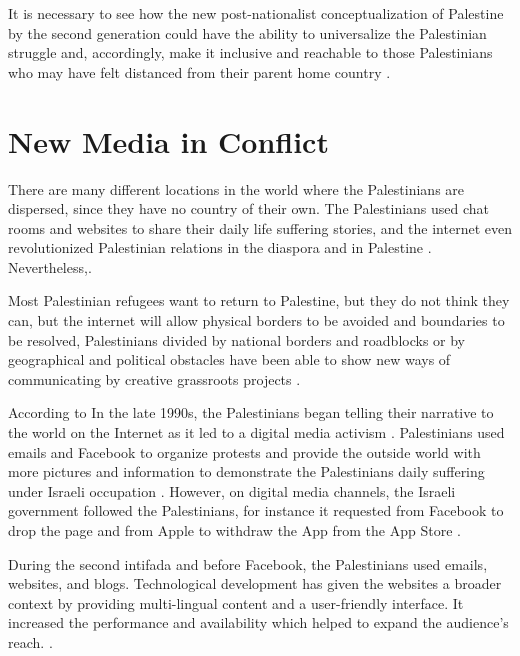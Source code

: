 It is necessary to see how the new post-nationalist conceptualization of Palestine by the second generation could have the ability to universalize the Palestinian struggle and, accordingly, make it inclusive and reachable to those Palestinians who may have felt distanced from their parent home country \citep{Blachnicka-Ciacek2018}. 

\section{New Media in Conflict}
There are many different locations in the world where the Palestinians are dispersed, since they have no country of their own. The Palestinians used chat rooms and websites to share their daily life suffering stories, and the internet even revolutionized Palestinian relations in the diaspora and in Palestine \citep{Ogunyemi2015, Aouragh2011}. Nevertheless,\cite [p.1]{Aouragh2011}.

Most Palestinian refugees want to return to Palestine, but they do not think they can, but the internet will allow physical borders to be avoided and boundaries to be resolved, Palestinians divided by national borders and roadblocks or by geographical and political obstacles have been able to show new ways of communicating by creative grassroots projects \citep{Aouragh2011}. 

According to \cite{Wulf2013} In the late 1990s, the Palestinians began telling their narrative to the world on the Internet as it led to a digital media activism \citep{Wulf2013}. Palestinians used emails and Facebook to organize protests and provide the outside world with more pictures and information to demonstrate the Palestinians daily suffering under Israeli occupation \citep{Wulf2013}. However, on digital media channels, the Israeli government followed the Palestinians, for instance it requested from Facebook to drop the page  and from Apple to withdraw the  App from the App Store \citep{Wulf2013}. 

During the second intifada and before Facebook, the Palestinians used emails, websites, and blogs. Technological development has given the websites a broader context by providing multi-lingual content and a user-friendly interface. It increased the performance and availability which helped to expand the audience's reach. \citep{Aouragh2011}. 



